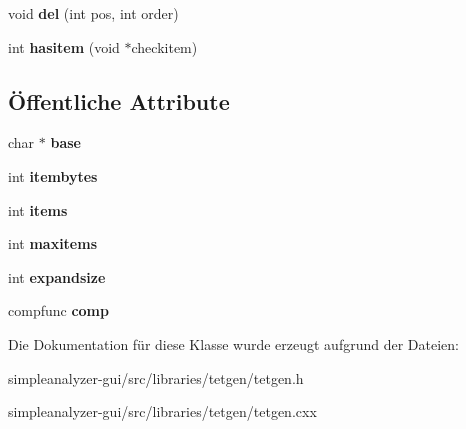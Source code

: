 \begin{DoxyCompactItemize}
\item 
\hypertarget{classtetgenmesh_1_1list_aa51fab5061f47b20636e1b27610811dc}{void {\bfseries del} (int pos, int order)}\label{classtetgenmesh_1_1list_aa51fab5061f47b20636e1b27610811dc}

\item 
\hypertarget{classtetgenmesh_1_1list_a899c167c62eb0bd64721b57e88dafb60}{int {\bfseries hasitem} (void $\ast$checkitem)}\label{classtetgenmesh_1_1list_a899c167c62eb0bd64721b57e88dafb60}

\end{DoxyCompactItemize}
\subsection*{Öffentliche Attribute}
\begin{DoxyCompactItemize}
\item 
\hypertarget{classtetgenmesh_1_1list_a5acf3b77fb5bd56db298971a647e8b5f}{char $\ast$ {\bfseries base}}\label{classtetgenmesh_1_1list_a5acf3b77fb5bd56db298971a647e8b5f}

\item 
\hypertarget{classtetgenmesh_1_1list_af9e6a5ea310f356f8f1255e0ec46d4b5}{int {\bfseries itembytes}}\label{classtetgenmesh_1_1list_af9e6a5ea310f356f8f1255e0ec46d4b5}

\item 
\hypertarget{classtetgenmesh_1_1list_a9114b463c08134a9801f3ddd5c81e5dc}{int {\bfseries items}}\label{classtetgenmesh_1_1list_a9114b463c08134a9801f3ddd5c81e5dc}

\item 
\hypertarget{classtetgenmesh_1_1list_a54c292508710e9a9c37e3722abcdebb5}{int {\bfseries maxitems}}\label{classtetgenmesh_1_1list_a54c292508710e9a9c37e3722abcdebb5}

\item 
\hypertarget{classtetgenmesh_1_1list_a38fed151924f61588cefdbfc16bf0bdd}{int {\bfseries expandsize}}\label{classtetgenmesh_1_1list_a38fed151924f61588cefdbfc16bf0bdd}

\item 
\hypertarget{classtetgenmesh_1_1list_a05f1c3fd04145d59828bced84ae34000}{compfunc {\bfseries comp}}\label{classtetgenmesh_1_1list_a05f1c3fd04145d59828bced84ae34000}

\end{DoxyCompactItemize}


Die Dokumentation für diese Klasse wurde erzeugt aufgrund der Dateien\-:\begin{DoxyCompactItemize}
\item 
simpleanalyzer-\/gui/src/libraries/tetgen/tetgen.\-h\item 
simpleanalyzer-\/gui/src/libraries/tetgen/tetgen.\-cxx\end{DoxyCompactItemize}
